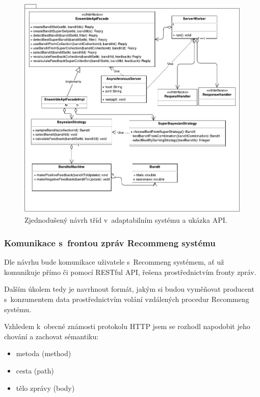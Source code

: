 \documentclass[thesis=M,czech]{FITthesis}[2014/05/07]
\begin{document}
\begin{figure}\centering
	\includegraphics[width=1.0\textwidth]{obr/ensembleDiagram.pdf}
 	\caption[Zjednodušený návrh tříd v~adaptabilním systému a ukázka API.]{Zjednodušený návrh tříd v~adaptabilním systému a ukázka API.}\label{fig:recommengNavrh}
\end{figure}	

\subsubsection{Komunikace s~frontou zpráv Recommeng systému}
\label{mess}
Dle návrhu bude komunikace uživatele s~Recommeng systémem, ať už komunikuje přímo či pomocí RESTful API, řešena prostřednictvím fronty zpráv.

Dalším úkolem tedy je navrhnout formát, jakým si budou vyměňovat producent s~konzumentem data prostřednictvím volání vzdálených procedur Recommeng systému.

Vzhledem k~obecné známosti protokolu HTTP jsem se rozhodl napodobit jeho chování a zachovat sémantiku:

\begin{itemize}
	\item metoda (method)
	\item cesta (path)
	\item tělo zprávy (body)
\end{itemize}
\end{document}
